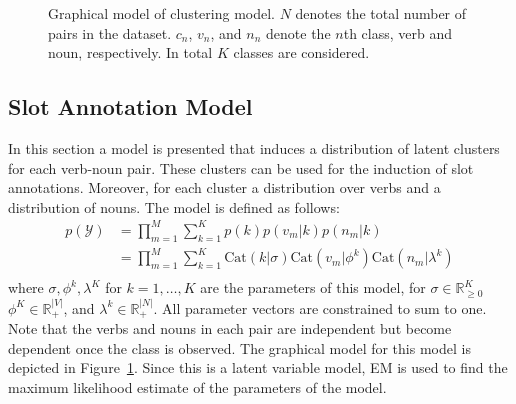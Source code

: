 \documentclass[11pt]{scrartcl}
\newcommand{\Cat}{\text{Cat}}
\begin{document}
\begin{figure}
\centering
{}
\caption{Graphical model of clustering model. $N$ denotes the total
number of pairs in the dataset. $c_n$, $v_n$, and $n_n$ denote the
$n$th class, verb and noun, respectively. In total $K$ classes are
considered.}
\label{fig:graphmodel}
\end{figure}


\subsection{Slot Annotation Model} %
\label{sec:verbclasses}
In this section a model is presented that induces a distribution of
latent clusters for each verb-noun pair. These clusters can be
used for the induction of slot annotations. Moreover, for each cluster a distribution over verbs and a distribution of nouns. The
model is defined as follows:
\begin{align*}
  p(\mathcal{Y})
  &= \prod_{m=1}^M \sum_{k=1}^K p(k)p(v_m|k)p(n_m|k) \\
  &= \prod_{m=1}^M \sum_{k=1}^K \Cat(k|\sigma)\Cat(v_m|\phi^k)\Cat(n_m|\lambda^k) \\
\end{align*}
where $\sigma, \phi^k, \lambda^K$ for $k=1,\ldots,K$ are the
parameters of this model, for $\sigma \in \mathbb{R}_{\ge 0}^K$ $\phi^K \in
\mathbb{R}_+^{|V|}$, and $\lambda^k \in \mathbb{R}_+^{|N|}$. All
parameter vectors are constrained to sum to one. Note that the verbs
and nouns in each pair are independent but become dependent once the
class is observed. The graphical model for this model is depicted in
Figure~\ref{fig:graphmodel}. Since this is a latent variable model, EM
is used to find the maximum likelihood estimate of the parameters of
the model.
\end{document}
